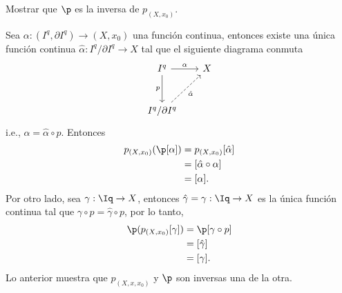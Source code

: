 \begin{ejercicio}
    Mostrar que $\p$ es la inversa de $p_{(X,x_0)
    }$.
\end{ejercicio}

\begin{demostracion}
Sea $\alpha:(I^q,\partial I^q)\to (X,x_0)$ una función continua, entonces existe una única función continua $\hat{\alpha}:I^q/\partial I^q\to X$ tal que el siguiente diagrama conmuta
\[
\begin{tikzcd}[column sep=0.65cm, row sep=1cm] 
        I^q\arrow[r,"\alpha"] \arrow[d,"p"'] & X\\
        I^q/\partial I^q \arrow[ur, dashed, "\hat{\alpha}"']
\end{tikzcd}
\]
i.e., $\alpha=\hat{\alpha}\circ p$. Entonces
\begin{align*}
    p_{(X,x_0)}(\p[\alpha])&=p_{(X,x_0)}[\hat{\alpha}]\\
    &=[\hat{\alpha}\circ \alpha]\\
    &=[\alpha].
\end{align*}
Por otro lado, sea $\gamma:\Iq\to X$, entonces $\hat{\gamma}=\gamma:\Iq\to X$ es la única función continua tal que $\gamma\circ p=\hat{\gamma}\circ p$, por lo tanto,
\begin{align*}
    \p(p_{(X,x_0)}[\gamma])&=\p[\gamma\circ p]\\
    &=[\hat{\gamma}]\\
    &=[\gamma].
\end{align*}
Lo anterior muestra que $p_{(X,x,x_0)}$ y $\p$ son inversas una de la otra.
\end{demostracion}
